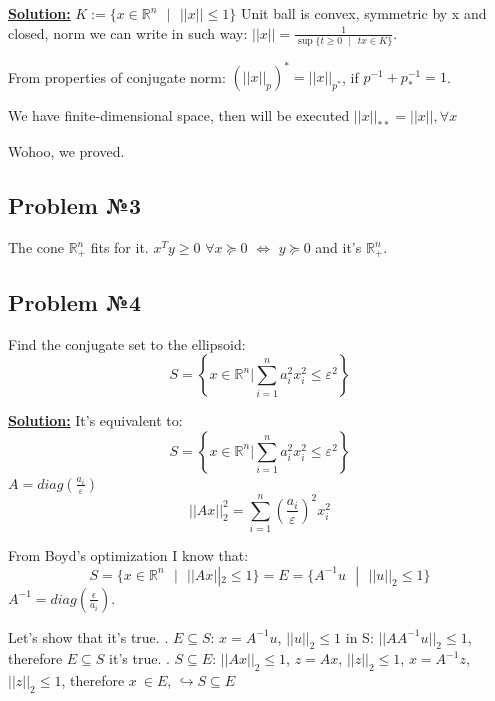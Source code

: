 \underline{\textbf{Solution:}}
$K := \{ x \in \mathds{R}^n \text{ } | \text{ } ||x|| \leq 1 \} $
Unit ball is convex, symmetric by x and closed, norm we can write in such way: $||x|| = \frac{1}{\sup \{t \geq 0 \text{ } | \text{ } tx \in K \} }$.

From properties of conjugate norm: $(||x||_p)^* = ||x||_{p^*}$, if $p^{-1} + p_*^{-1} = 1$.

We have finite-dimensional space, then will be executed $||x||_{**} = ||x||, \forall x$

Wohoo, we proved.

\subsection{Problem №3}
The cone $\mathds{R}_{+}^n$ fits for it. $x^Ty \geq 0$ $\forall x \succcurlyeq 0$ $\Longleftrightarrow$ $y \succcurlyeq 0$ and it's $\mathds{R}_{+}^n$.

\subsection{Problem №4}
Find the conjugate set to the ellipsoid:
\begin{equation*}
    S = \left\{ x \in \mathds{R}^n | \sum\limits_{i=1}^n a_i^2x_i^2 \leq \varepsilon^2 \right\}
\end{equation*}

\underline{\textbf{Solution:}}
It's equivalent to:
\begin{equation*}
    S = \left\{ x \in \mathds{R}^n | \sum\limits_{i=1}^n a_i^2x_i^2 \leq \varepsilon^2 \right\}
\end{equation*}
$A = diag(\frac{a_i}{\varepsilon})$
\begin{equation*}
    ||Ax||_2^2 = \sum\limits_{i=1}^n (\frac{a_i}{\varepsilon})^2x_i^2
\end{equation*}

From Boyd's optimization I know that:
\begin{equation*}
S = \{ x \in \mathds{R}^n \text{ } | \text{ }||Ax||_2 \leq 1 \} = E = \{ A^{-1}u \text{ } | \text{ } ||u||_2 \leq 1\}    
\end{equation*}
$A^{-1} = diag(\frac{\epsilon}{a_i})$. 

Let's show that it's true.
. $E \subseteq S$: $x = A^{-1}u$, $||u||_2 \leq 1$ in S: $||AA^{-1}u||_2 \leq 1$, therefore $E \subseteq S$ it's true.
. $S \subseteq E$: $||Ax||_2 \leq 1$, $z = Ax$, $||z||_2 \leq 1$, $x = A^{-1}z$, $||z||_2 \leq 1$, therefore $x\ \in E$, $\hookrightarrow S \subseteq E$

